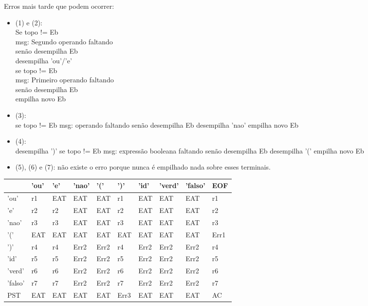\documentclass[11pt]{article}
\begin{document}
Erros mais tarde que podem ocorrer:
\begin{itemize}
\item (1) e (2):\\
Se topo != Eb\\
  msg: Segundo operando faltando\\
senão desempilha Eb\\
desempilha 'ou'/'e'\\
se topo != Eb\\
  msg: Primeiro operando faltando\\
senão desempilha Eb\\
empilha novo Eb\\
\item (3): \\
se topo != Eb
msg: operando faltando
senão desempilha Eb
desempilha 'nao'
empilha novo Eb
\item (4): \\
desempilha ')'
se topo != Eb
msg: expressão booleana faltando
senão desempilha Eb
desempilha '('
empilha novo Eb
\item (5), (6) e (7):
não existe o erro porque nunca é empilhado nada sobre esses
terminais.
\end{itemize}


\begin{center}
\begin{tabular}{l|lllllllll|}
\hline
 & 'ou' & 'e' & 'nao' & '(' & ')' & 'id' & 'verd' & 'falso' & EOF\\
\hline
\hline
'ou' & r1 & EAT & EAT & EAT & r1 & EAT & EAT & EAT & r1\\
\hline
'e' & r2 & r2 & EAT & EAT & r2 & EAT & EAT & EAT & r2\\
\hline
'nao' & r3 & r3 & EAT & EAT & r3 & EAT & EAT & EAT & r3\\
\hline
'(' & EAT & EAT & EAT & EAT & EAT & EAT & EAT & EAT & Err1\\
\hline
')' & r4 & r4 & Err2 & Err2 & r4 & Err2 & Err2 & Err2 & r4\\
\hline
'id' & r5 & r5 & Err2 & Err2 & r5 & Err2 & Err2 & Err2 & r5\\
\hline
'verd' & r6 & r6 & Err2 & Err2 & r6 & Err2 & Err2 & Err2 & r6\\
\hline
'falso' & r7 & r7 & Err2 & Err2 & r7 & Err2 & Err2 & Err2 & r7\\
\hline
PST & EAT & EAT & EAT & EAT & Err3 & EAT & EAT & EAT & AC\\
\hline
\end{tabular}
\end{center}
\end{document}

